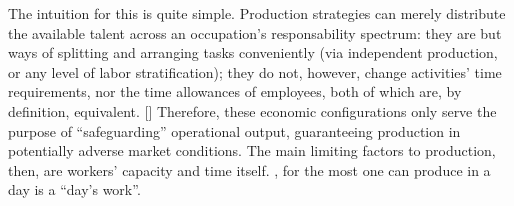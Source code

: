 \documentclass[hidelinks, nonatbib]{elsarticle}
\begin{document}
The intuition for this is quite simple. Production strategies can merely distribute the available talent across an occupation's responsability spectrum: they are but ways of splitting and arranging tasks conveniently (via independent production, or any level of labor stratification); they do not, however, change activities' time requirements, nor the time allowances of employees, both of which are, by definition, equivalent. [] Therefore, these economic configurations only serve the purpose of ``safeguarding'' operational output, guaranteeing production in potentially adverse market conditions. The main limiting factors to production, then, are workers' capacity and time itself.
, for the most one can produce in a day is a ``day's work''.
% 
\end{document}
